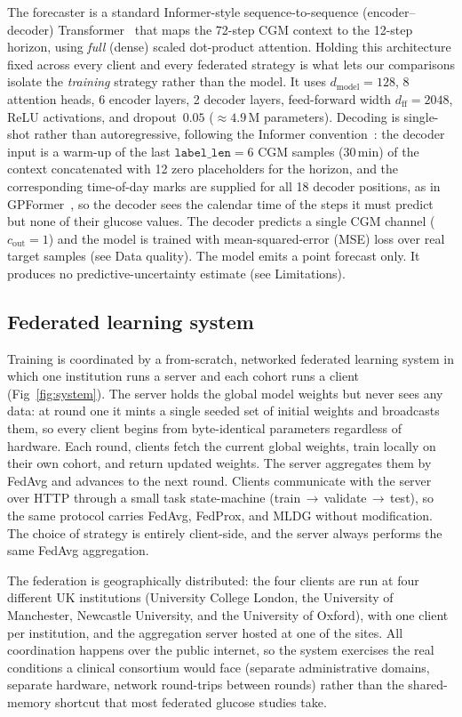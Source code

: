 \documentclass[10pt,letterpaper]{article}
\begin{document}
The forecaster is a standard Informer-style sequence-to-sequence
(encoder--decoder) Transformer~\cite{zhou2021informer} that maps
the 72-step CGM context to the 12-step horizon, using \emph{full}
(dense) scaled dot-product attention.
Holding this architecture fixed across every client and every federated
strategy is what lets our comparisons isolate the \emph{training} strategy rather
than the model. It uses
$d_{\text{model}}=128$, 8 attention heads, 6 encoder layers, 2 decoder layers,
feed-forward width $d_{\text{ff}}=2048$, ReLU activations, and dropout~$0.05$
($\approx 4.9$\,M parameters). Decoding is single-shot rather than
autoregressive, following the Informer convention~\cite{zhou2021informer}: the
decoder input is a warm-up of the last $\texttt{label\_len}=6$ CGM samples
(30\,min) of the context concatenated with 12 zero placeholders for the horizon,
and the corresponding time-of-day marks are supplied for all 18 decoder
positions, as in GPFormer~\cite{zhu2024gpformer}, so the decoder sees the
calendar time of the steps it must predict but
none of their glucose values. The decoder predicts a single CGM channel ($c_{\text{out}}=1$) and the
model is trained with mean-squared-error (MSE) loss over real target samples
(see Data quality). The model emits a point
forecast only. It produces no predictive-uncertainty estimate (see Limitations).

\subsection*{Federated learning system}

Training is coordinated by a from-scratch, networked federated learning system
in which one institution runs a server and each cohort runs a client
(Fig~\ref{fig:system}). The server
holds the global model weights but never sees any data: at round one it mints a
single seeded set of initial weights and broadcasts them, so every client begins
from byte-identical parameters regardless of hardware. Each round, clients fetch
the current global weights, train locally on their own cohort, and return updated
weights. The server aggregates them by FedAvg and advances to the next round.
Clients communicate with the server over HTTP through a small task
state-machine (train\,$\rightarrow$\,validate\,$\rightarrow$\,test), so the same
protocol carries FedAvg, FedProx, and MLDG without modification. The choice of
strategy is entirely client-side, and the server always performs the same FedAvg
aggregation.

The federation is geographically distributed: the four clients are run at four
different UK institutions (University College London, the University of
Manchester, Newcastle University, and the University of Oxford), with one client
per institution, and the aggregation server hosted at one of the sites. All
coordination happens
over the public internet, so the system exercises the real conditions a clinical
consortium would face (separate administrative domains, separate hardware,
network round-trips between rounds) rather than the shared-memory shortcut that
most federated glucose studies take.
\end{document}
